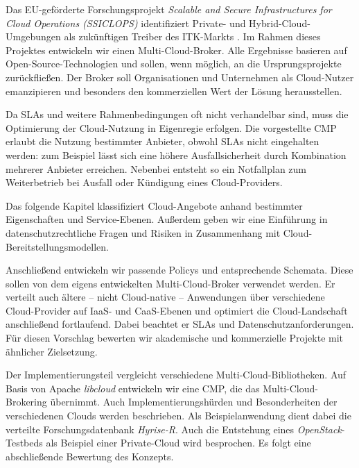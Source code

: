 \noindent 
Das EU-geförderte Forschungsprojekt \emph{Scalable and Secure Infrastructures for Cloud Operations (SSICLOPS)} identifiziert Private- und Hybrid-Cloud-Umgebungen als zukünftigen Treiber des ITK-Markts \cite{ssiclops:2015:d6.1-project-presentation}. Im Rahmen dieses Projektes entwickeln wir einen Multi-Cloud-Broker. Alle Ergebnisse basieren auf Open-Source-Technologien und sollen, wenn möglich, an die Ursprungsprojekte zurückfließen. Der Broker soll Organisationen und Unternehmen als Cloud-Nutzer emanzipieren und besonders den kommerziellen Wert der Lösung herausstellen.


Da SLAs und weitere Rahmenbedingungen oft nicht verhandelbar sind, muss die Optimierung der Cloud-Nutzung in Eigenregie erfolgen.  Die vorgestellte CMP erlaubt die Nutzung bestimmter Anbieter, obwohl SLAs  nicht eingehalten werden: zum Beispiel lässt sich eine höhere Ausfallsicherheit durch Kombination mehrerer Anbieter erreichen. Nebenbei entsteht so ein Notfallplan zum Weiterbetrieb bei Ausfall oder Kündigung eines Cloud-Providers.

Das folgende Kapitel klassifiziert Cloud-Angebote anhand bestimmter Eigenschaften und Service-Ebenen. Außerdem geben wir eine Einführung in datenschutzrechtliche Fragen und Risiken in Zusammenhang mit Cloud-Bereit\-stel\-lungs\-model\-len.

Anschließend entwickeln wir passende Policys und entsprechende Schemata. Diese sollen von dem eigens entwickelten Multi-Cloud-Broker verwendet werden. Er verteilt auch ältere -- nicht Cloud-native -- Anwendungen über verschiedene Cloud-Provider auf IaaS- und CaaS-Ebenen und optimiert die Cloud-Landschaft anschließend fortlaufend. Dabei beachtet er SLAs und Datenschutzanforderungen. Für diesen Vorschlag bewerten wir akademische und kommerzielle Projekte mit ähnlicher Zielsetzung.

Der Implementierungsteil vergleicht verschiedene Multi-Cloud-Bibliotheken. Auf Basis von Apache \emph{libcloud} entwickeln wir eine CMP, die das Multi-Cloud-Brokering übernimmt. Auch Implementierungshürden und Besonderheiten der verschiedenen Clouds werden beschrieben. Als Beispielanwendung dient dabei die verteilte Forschungsdatenbank \emph{Hyrise-R}. Auch die Entstehung eines \emph{OpenStack}-Testbeds als Beispiel einer Private-Cloud wird besprochen. Es folgt eine abschließende Bewertung des Konzepts.

